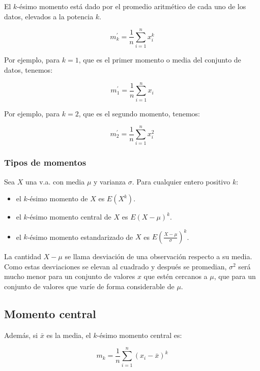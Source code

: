 El $k$-ésimo momento está dado por el promedio aritmético de cada uno de los
datos, elevados a la potencia $k$.

\begin{equation}
  m_{k}^{'} = \frac{1}{n} \sum_{i=1}^{n} x_{i}^{k}
\end{equation}

Por ejemplo, para $k=1$, que es el primer momento o media del conjunto de datos, tenemos:

\begin{equation}
  m_{1}^{'} = \frac{1}{n} \sum_{i=1}^{n} x_{i}
\end{equation}
  
Por ejemplo, para $k=2$, que es el segundo momento, tenemos:

\begin{equation}
  m_{2}^{'} = \frac{1}{n} \sum_{i=1}^{n} x_{i}^{2}
\end{equation}
  
\subsubsection{Tipos de momentos}
Sea $X$ una v.a. con media $\mu$ y varianza $\sigma$. Para cualquier entero
positivo $k$:
  
\begin{itemize}
  \item el $k$-ésimo momento de $X$ es $E(X^k)$.
  \item el $k$-ésimo momento central de $X$ es $E(X-\mu)^k$.
  \item el $k$-ésimo momento estandarizado de $X$ es $E(\frac{X-\mu}{\sigma})^k$.
\end{itemize}
  
La cantidad $X-\mu$ se llama desviación de una observación respecto a su media.
Como estas desviaciones se elevan al cuadrado y después se promedian, $\sigma^2$
será mucho menor para un conjunto de valores $x$ que estén cercanos a $\mu$, que
para un conjunto de valores que varíe de forma considerable de $\mu$.
  
\subsection{Momento central}

Además, si $\bar{x}$ es la media, el $k$-ésimo momento central es:

\begin{equation}
  m_{k} = \frac{1}{n} \sum_{i=1}^{n} (x_{i} - \bar{x})^k
\end{equation}

